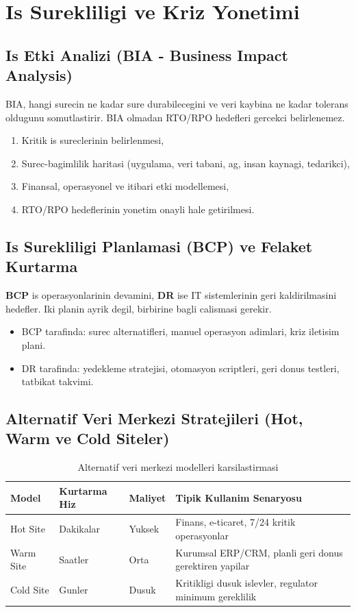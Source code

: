 \section{Is Surekliligi ve Kriz Yonetimi}

\subsection{Is Etki Analizi (BIA - Business Impact Analysis)}
BIA, hangi surecin ne kadar sure durabilecegini ve veri kaybina ne kadar tolerans oldugunu
somutlastirir. BIA olmadan RTO/RPO hedefleri gercekci belirlenemez.

\begin{enumerate}
    \item Kritik is sureclerinin belirlenmesi,
    \item Surec-bagimlilik haritasi (uygulama, veri tabani, ag, insan kaynagi, tedarikci),
    \item Finansal, operasyonel ve itibari etki modellemesi,
    \item RTO/RPO hedeflerinin yonetim onayli hale getirilmesi.
\end{enumerate}

\subsection{Is Surekliligi Planlamasi (BCP) ve Felaket Kurtarma}
\textbf{BCP} is operasyonlarinin devamini, \textbf{DR} ise IT sistemlerinin geri kaldirilmasini hedefler.
Iki planin ayrik degil, birbirine bagli calismasi gerekir.

\begin{itemize}
    \item BCP tarafinda: surec alternatifleri, manuel operasyon adimlari, kriz iletisim plani.
    \item DR tarafinda: yedekleme stratejisi, otomasyon scriptleri, geri donus testleri, tatbikat takvimi.
\end{itemize}

\subsection{Alternatif Veri Merkezi Stratejileri (Hot, Warm ve Cold Siteler)}

\begin{table}[htbp]
\centering
\caption{Alternatif veri merkezi modelleri karsilastirmasi}
\begin{tabular}{|p{2.6cm}|p{3.5cm}|p{3.0cm}|p{5.1cm}|}
\hline
\textbf{Model} & \textbf{Kurtarma Hiz} & \textbf{Maliyet} & \textbf{Tipik Kullanim Senaryosu} \\
\hline
Hot Site & Dakikalar & Yuksek & Finans, e-ticaret, 7/24 kritik operasyonlar \\
\hline
Warm Site & Saatler & Orta & Kurumsal ERP/CRM, planli geri donus gerektiren yapilar \\
\hline
Cold Site & Gunler & Dusuk & Kritikligi dusuk islevler, regulator minimum gereklilik \\
\hline
\end{tabular}
\end{table}

